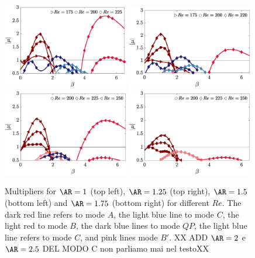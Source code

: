 \begin{figure}
  \centering
  \includegraphics[width=0.49\textwidth]{./fig/AR1/neutralb.eps}
  \includegraphics[width=0.49\textwidth]{./fig/AR1p25/neutralb.eps}  
  \includegraphics[width=0.49\textwidth]{./fig/AR1p5/neutralb.eps}    
  \includegraphics[width=0.49\textwidth]{./fig/AR1p75/neutralb.eps}       
  \caption{Multipliers for $\AR=1$ (top left), $\AR=1.25$ (top right), $\AR=1.5$ (bottom left) and $\AR=1.75$ (bottom right) for different $Re$. The dark red line refers to mode $A$, the light blue line to mode $C$, the light red to mode $B$, the dark blue lines to mode $QP$, the light blue line refers to mode $C$, and pink lines mode $B'$. XX ADD $\AR=2$ e $\AR=2.5$ DEL MODO C non parliamo mai nel testoXX}
  \label{fig:mult_AR1_AR1p75}
\end{figure}
